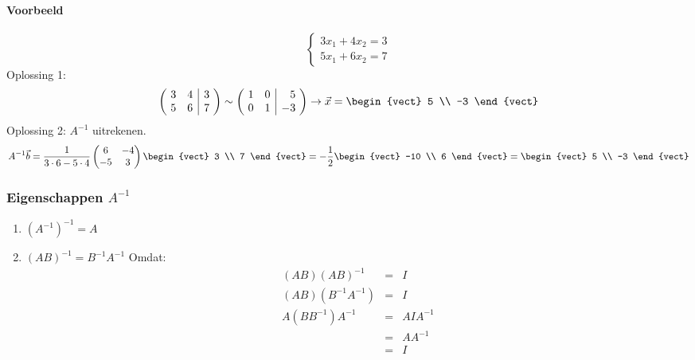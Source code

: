 \paragraph{Voorbeeld}
\[ \left\{\begin{array}{l} 3x_1 + 4x_2 = 3 \\
5x_1 + 6x_2 = 7
\end{array}\right. \]
Oplossing 1: \[ \left(\!\begin{array}{rr|r} 3 & 4 & 3 \\
5 & 6 & 7 \end{array}\!\right) \sim \left(\!\begin{array}{rr|r} 1 & 0 & 5 \\
0 & 1 & -3 \end{array}\!\right) \to \vec{x} = \begin{vect} 5 \\ -3 \end{vect} \]
Oplossing 2: $A^{-1}$ uitrekenen. \[A^{-1} \vec{b} = \frac{1}{3 \cdot 6 - 5 \cdot 4} \begin{pmatrix} 6 & -4 \\
-5 & 3 \end{pmatrix} \begin{vect} 3 \\ 7 \end{vect} = -\frac{1}{2} \begin{vect} -10 \\ 6 \end{vect} = \begin{vect} 5 \\ -3 \end{vect} \]

\subsubsection{Eigenschappen $A^{-1}$}
\begin{enumerate}
	\item $(A^{-1})^{-1} = A$
	\item $(AB)^{-1} = B^{-1}A^{-1}$ Omdat:
	\begin{eqnarray*}
		(AB)(AB)^{-1} &=& I \\
		(AB)(B^{-1}A^{-1}) &=& I \\
		A(BB^{-1})A^{-1} &=& AIA^{-1} \\
		&=& AA^{-1} \\
		&=& I
	\end{eqnarray*}
\end{enumerate}

